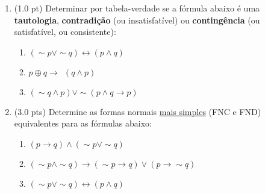 \documentclass[12pt]{article}
\begin{document}
\begin{enumerate}
\itemsep 15pt
\item (1.0 pt) Determinar por tabela-verdade se a fórmula abaixo é uma {\bf tautologia}, {\bf contradição} (ou insatisfatível) ou {\bf contingência} (ou satisfatível, ou consistente): 

\begin{enumerate}
\setlength{\itemsep}{-2pt}
\item $(\sim p \vee \sim q) \leftrightarrow  (p \wedge q) $
\item $p \oplus q \rightarrow ~~(q \wedge p)$


\item $ (\sim q \wedge p) \vee \sim (p \wedge q \rightarrow p) $ 


\end{enumerate}


\item (3.0 pts) Determine as formas normais \underline{mais simples} (FNC e FND) equivalentes para as fórmulas abaixo: 

\begin{enumerate}
\setlength{\itemsep}{-2pt}


\item $(p \rightarrow q)  \wedge  (\sim p \vee \sim q) $

\item $(\sim p \wedge \sim q) \rightarrow (\sim p \rightarrow  q) \vee  ( p \rightarrow  \sim q)$

\item $(\sim p \vee \sim q) \leftrightarrow (p \wedge q) $


\end{enumerate}


\end{enumerate}
\end{document}
